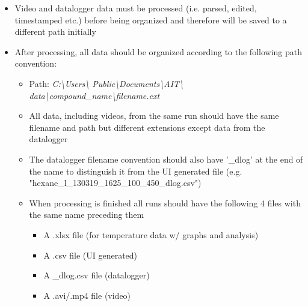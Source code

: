 \documentclass[letterpaper,11pt]{article}
\begin{document}
\begin{itemize}
    \item Video and datalogger data must be processed (i.e. parsed, edited, 
        timestamped etc.) before being organized and therefore will be saved to 
        a different path initially

    \item After processing, all data should be organized according to the 
        following path convention:
        \begin{itemize}
        \item Path: \textit{C:\textbackslash Users\textbackslash 
            Public\textbackslash Documents\textbackslash AIT\textbackslash 
            data\textbackslash compound\_name\textbackslash filename.ext}
        \item All data, including videos, from the same run should have the same
            filename and path but different extensions except data from the 
            datalogger
        \item The datalogger filename convention should also have '\_dlog' at 
            the end of the name to distinguish it from the UI generated file 
            (e.g. "hexane\_l\_130319\_1625\_100\_450\_dlog.csv")
        \item When processing is finished all runs should have the following 
            4 files with the same name preceding them
            \begin{itemize}
            \item A .xlsx file (for temperature data w/ graphs and analysis)
            \item A .csv file (UI generated)
            \item A \_dlog.csv file (datalogger)
            \item A .avi/.mp4 file (video)
            \end{itemize}
        \end{itemize}


\end{itemize}
\end{document}
